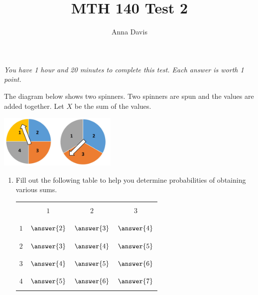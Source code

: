 \documentclass{ximera}
\author{Anna Davis} \title{MTH 140 Test 2}
\begin{document}
\begin{abstract}

\end{abstract}
\maketitle
 \textit{You have 1 hour and 20 minutes to complete this test.  Each answer is worth 1 point.}
\begin{problem}\label{prob:exam2prob1}
The diagram below shows two spinners.  Two spinners are spun and the values are added together.  Let $X$ be the sum of the values.  

\begin{image}
   
\includegraphics[height=1in]{test2spinners.jpg}
 
\end{image}



\begin{enumerate}
    \item Fill out the following table to help you determine probabilities of obtaining various sums.
    
\begin{center}
\begin{tabular}{|c|c|c|c|}
 \hline
 && &   \\
 & $1$& $2$ &$3$ \\
 && &   \\
  \hline
  && & \\
 $1$&$\answer{2}$&$\answer{3}$&$\answer{4}$ \\
  &&& \\
 \hline
  &&& \\
 $2$&$\answer{3}$&$\answer{4}$ &$\answer{5}$ \\
  &&& \\
 \hline
  &&& \\
  $3$&$\answer{4}$&$\answer{5}$  &$\answer{6}$ \\
  &&& \\
 \hline
 &&& \\
  $4$&$\answer{5}$&$\answer{6}$  &$\answer{7}$ \\
  &&& \\
 \hline
 \end{tabular}
\end{center}    
    

\end{enumerate}
\end{problem}
\end{document}
